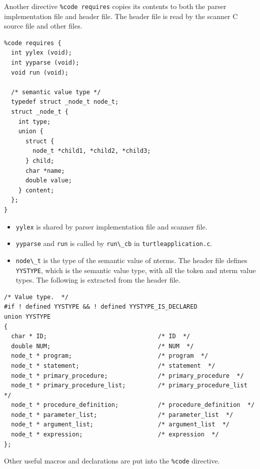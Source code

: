 Another directive \passthrough{\lstinline!\%code requires!} copies its
contents to both the parser implementation file and header file. The
header file is read by the scanner C source file and other files.

\begin{lstlisting}
%code requires {
  int yylex (void);
  int yyparse (void);
  void run (void);

  /* semantic value type */
  typedef struct _node_t node_t;
  struct _node_t {
    int type;
    union {
      struct {
        node_t *child1, *child2, *child3;
      } child;
      char *name;
      double value;
    } content;
  };
}
\end{lstlisting}

\begin{itemize}
\tightlist
\item
  \passthrough{\lstinline!yylex!} is shared by parser implementation
  file and scanner file.
\item
  \passthrough{\lstinline!yyparse!} and \passthrough{\lstinline!run!} is
  called by \passthrough{\lstinline!run\_cb!} in
  \passthrough{\lstinline!turtleapplication.c!}.
\item
  \passthrough{\lstinline!node\_t!} is the type of the semantic value of
  nterms. The header file defines \passthrough{\lstinline!YYSTYPE!},
  which is the semantic value type, with all the token and nterm value
  types. The following is extracted from the header file.
\end{itemize}

\begin{lstlisting}
/* Value type.  */
#if ! defined YYSTYPE && ! defined YYSTYPE_IS_DECLARED
union YYSTYPE
{
  char * ID;                               /* ID  */
  double NUM;                              /* NUM  */
  node_t * program;                        /* program  */
  node_t * statement;                      /* statement  */
  node_t * primary_procedure;              /* primary_procedure  */
  node_t * primary_procedure_list;         /* primary_procedure_list  */
  node_t * procedure_definition;           /* procedure_definition  */
  node_t * parameter_list;                 /* parameter_list  */
  node_t * argument_list;                  /* argument_list  */
  node_t * expression;                     /* expression  */
};
\end{lstlisting}

Other useful macros and declarations are put into the
\passthrough{\lstinline!\%code!} directive.

